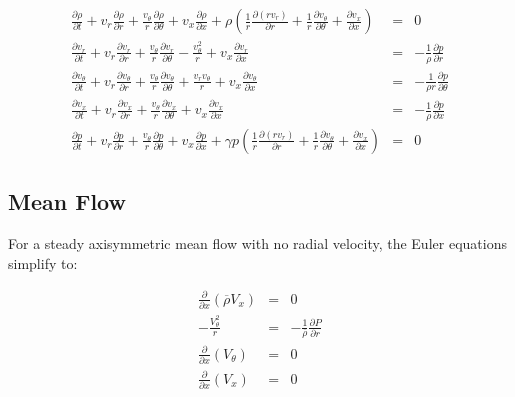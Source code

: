 \documentclass[12pt]{article}
\begin{document}
\begin{eqnarray}
\frac{\partial {\rho}}{\partial t} 
+ v_r \frac{\partial {\rho}}{\partial r}
+ \frac{v_{\theta}}{r} \frac{\partial {\rho}}{\partial \theta}
+ v_x \frac{\partial {\rho}}{\partial x}
+ {\rho}
\left(
\frac{1}{r} \frac{\partial \left(r v_r \right)}{\partial r}
+\frac{1}{r} \frac{\partial v_{\theta} }{\partial \theta}
+ \frac{\partial v_x }{\partial x}
\right)
&=&
0
\nonumber
\\
\frac{\partial v_r}{\partial t} 
+v_r \frac{\partial v_r}{\partial r}
+ \frac{v_{\theta}}{r}
\frac{\partial v_r}{\partial \theta}
-\frac{v_{\theta}^2}{r}
+v_x \frac{\partial v_r}{\partial x}
&=&
-\frac{1}{{\rho}} \frac{\partial p}{\partial r}
\nonumber
\\
\frac{\partial v_{\theta}}{\partial t} 
+v_r \frac{\partial v_{\theta}}{\partial r}
+ \frac{v_{\theta}}{r}
\frac{\partial v_{\theta}}{\partial \theta}
+\frac{v_r v_{\theta}}{r}
+v_x \frac{\partial v_{\theta}}{\partial x}
&=&
-\frac{1}{{\rho} r} \frac{\partial p}{\partial \theta}
\nonumber
\\
\frac{\partial v_x}{\partial t} 
+v_r \frac{\partial v_x}{\partial r}
+ \frac{v_{\theta}}{r}
\frac{\partial v_x}{\partial \theta}
+v_x \frac{\partial v_x}{\partial x}
&=&
-\frac{1}{{\rho}} \frac{\partial p}{\partial x}
\nonumber
\\
\frac{\partial p}{\partial t} 
+ v_r \frac{\partial p}{\partial r}
+ \frac{v_{\theta}}{r} \frac{\partial p}{\partial \theta}
+ v_x \frac{\partial p}{\partial x}
+ \gamma p
\left(
\frac{1}{r} \frac{\partial \left(r v_r \right)}{\partial r}
+\frac{1}{r} \frac{\partial v_{\theta} }{\partial \theta}
+ \frac{\partial v_x }{\partial x}
\right)
&=&
0
\nonumber
\end{eqnarray}

\subsection{Mean Flow}

For a steady axisymmetric mean flow with no radial velocity, the Euler equations simplify to:

\begin{eqnarray}
 \frac{\partial}{\partial x} \left(\overline{\rho} V_{x} \right)
&=&
0
\nonumber
\\
-\frac{V_{\theta}^2}{r}
&=&
-\frac{1}{\overline{\rho}} \frac{\partial P}{\partial r}
\nonumber
\\
 \frac{\partial}{\partial x} \left(V_{\theta} \right)
&=&
0
\nonumber
\\
 \frac{\partial}{\partial x} \left(V_{x} \right)
&=&
0
\nonumber
\end{eqnarray}
\end{document}
